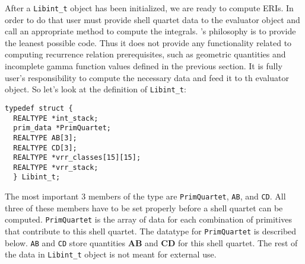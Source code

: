 \documentclass[12pt]{article}
\begin{document}
After a {\tt Libint\_t} object has been initialized,
we are ready to compute ERIs. In order to do that user must provide
shell quartet data to the evaluator object and call an appropriate method
to compute the integrals.
\LIBINT 's philosophy is to provide the leanest possible code. Thus it does not provide any functionality
related to computing recurrence relation prerequisites, such as geometric quantities and incomplete gamma
function values defined in the previous section. It is fully user's responsibility to compute the necessary
data and feed it to th evaluator object.
So let's look at the definition of {\tt Libint\_t}:
\begin{verbatim}
typedef struct {
  REALTYPE *int_stack;
  prim_data *PrimQuartet;
  REALTYPE AB[3];
  REALTYPE CD[3];
  REALTYPE *vrr_classes[15][15];
  REALTYPE *vrr_stack;
  } Libint_t;
\end{verbatim}
The most important 3 members of the type are {\tt PrimQuartet}, {\tt AB}, and
{\tt CD}. All three of these members have to be set properly before a shell quartet can be computed.
{\tt PrimQuartet} is the array of data for each combination of primitives that
contribute to this shell quartet. The datatype for {\tt PrimQuartet} is described below.
{\tt AB} and {\tt CD} store quantities {\bf AB} and {\bf CD} for this shell quartet.
The rest of the data in {\tt Libint\_t} object is not meant for external use.
\end{document}
